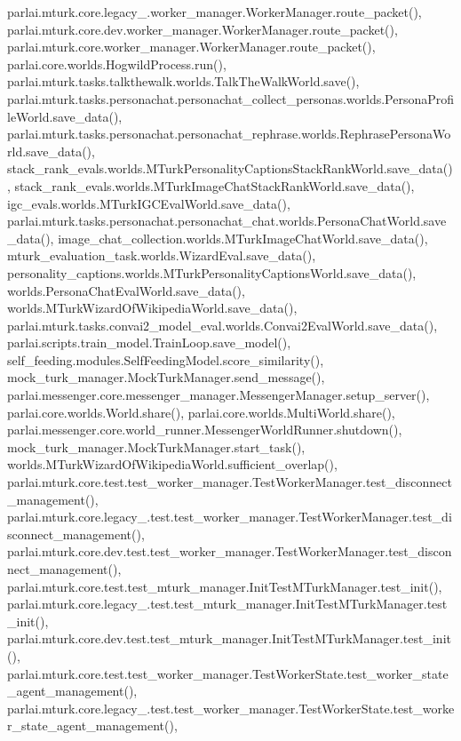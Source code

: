parlai.\+mturk.\+core.\+legacy\+\_.\+worker\+\_\+manager.\+Worker\+Manager.\+route\+\_\+packet(), parlai.\+mturk.\+core.\+dev.\+worker\+\_\+manager.\+Worker\+Manager.\+route\+\_\+packet(), parlai.\+mturk.\+core.\+worker\+\_\+manager.\+Worker\+Manager.\+route\+\_\+packet(), parlai.\+core.\+worlds.\+Hogwild\+Process.\+run(), parlai.\+mturk.\+tasks.\+talkthewalk.\+worlds.\+Talk\+The\+Walk\+World.\+save(), parlai.\+mturk.\+tasks.\+personachat.\+personachat\+\_\+collect\+\_\+personas.\+worlds.\+Persona\+Profile\+World.\+save\+\_\+data(), parlai.\+mturk.\+tasks.\+personachat.\+personachat\+\_\+rephrase.\+worlds.\+Rephrase\+Persona\+World.\+save\+\_\+data(), stack\+\_\+rank\+\_\+evals.\+worlds.\+M\+Turk\+Personality\+Captions\+Stack\+Rank\+World.\+save\+\_\+data(), stack\+\_\+rank\+\_\+evals.\+worlds.\+M\+Turk\+Image\+Chat\+Stack\+Rank\+World.\+save\+\_\+data(), igc\+\_\+evals.\+worlds.\+M\+Turk\+I\+G\+C\+Eval\+World.\+save\+\_\+data(), parlai.\+mturk.\+tasks.\+personachat.\+personachat\+\_\+chat.\+worlds.\+Persona\+Chat\+World.\+save\+\_\+data(), image\+\_\+chat\+\_\+collection.\+worlds.\+M\+Turk\+Image\+Chat\+World.\+save\+\_\+data(), mturk\+\_\+evaluation\+\_\+task.\+worlds.\+Wizard\+Eval.\+save\+\_\+data(), personality\+\_\+captions.\+worlds.\+M\+Turk\+Personality\+Captions\+World.\+save\+\_\+data(), worlds.\+Persona\+Chat\+Eval\+World.\+save\+\_\+data(), worlds.\+M\+Turk\+Wizard\+Of\+Wikipedia\+World.\+save\+\_\+data(), parlai.\+mturk.\+tasks.\+convai2\+\_\+model\+\_\+eval.\+worlds.\+Convai2\+Eval\+World.\+save\+\_\+data(), parlai.\+scripts.\+train\+\_\+model.\+Train\+Loop.\+save\+\_\+model(), self\+\_\+feeding.\+modules.\+Self\+Feeding\+Model.\+score\+\_\+similarity(), mock\+\_\+turk\+\_\+manager.\+Mock\+Turk\+Manager.\+send\+\_\+message(), parlai.\+messenger.\+core.\+messenger\+\_\+manager.\+Messenger\+Manager.\+setup\+\_\+server(), parlai.\+core.\+worlds.\+World.\+share(), parlai.\+core.\+worlds.\+Multi\+World.\+share(), parlai.\+messenger.\+core.\+world\+\_\+runner.\+Messenger\+World\+Runner.\+shutdown(), mock\+\_\+turk\+\_\+manager.\+Mock\+Turk\+Manager.\+start\+\_\+task(), worlds.\+M\+Turk\+Wizard\+Of\+Wikipedia\+World.\+sufficient\+\_\+overlap(), parlai.\+mturk.\+core.\+test.\+test\+\_\+worker\+\_\+manager.\+Test\+Worker\+Manager.\+test\+\_\+disconnect\+\_\+management(), parlai.\+mturk.\+core.\+legacy\+\_.\+test.\+test\+\_\+worker\+\_\+manager.\+Test\+Worker\+Manager.\+test\+\_\+disconnect\+\_\+management(), parlai.\+mturk.\+core.\+dev.\+test.\+test\+\_\+worker\+\_\+manager.\+Test\+Worker\+Manager.\+test\+\_\+disconnect\+\_\+management(), parlai.\+mturk.\+core.\+test.\+test\+\_\+mturk\+\_\+manager.\+Init\+Test\+M\+Turk\+Manager.\+test\+\_\+init(), parlai.\+mturk.\+core.\+legacy\+\_.\+test.\+test\+\_\+mturk\+\_\+manager.\+Init\+Test\+M\+Turk\+Manager.\+test\+\_\+init(), parlai.\+mturk.\+core.\+dev.\+test.\+test\+\_\+mturk\+\_\+manager.\+Init\+Test\+M\+Turk\+Manager.\+test\+\_\+init(), parlai.\+mturk.\+core.\+test.\+test\+\_\+worker\+\_\+manager.\+Test\+Worker\+State.\+test\+\_\+worker\+\_\+state\+\_\+agent\+\_\+management(), parlai.\+mturk.\+core.\+legacy\+\_.\+test.\+test\+\_\+worker\+\_\+manager.\+Test\+Worker\+State.\+test\+\_\+worker\+\_\+state\+\_\+agent\+\_\+management(), 